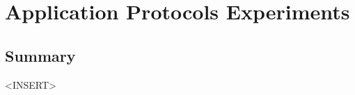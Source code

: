 \section{Application Protocols Experiments}

\clearpage


\clearpage


\clearpage


\clearpage


\clearpage

\subsection{Summary}

<INSERT>

